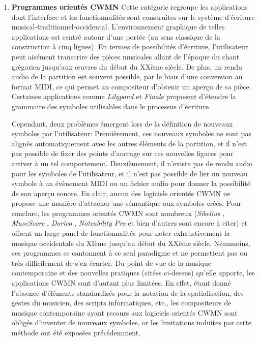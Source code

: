\begin{enumerate}[label=(\arabic*)]
	\item \textbf{Programmes orientés CWMN} Cette catégorie regroupe les applications dont l'interface et les fonctionnalités sont construites sur le système d'écriture musical-traditionnel-occidental. L'environnement graphique de telles applications est centré autour d'une portée (au sens classique de la construction à cinq lignes). En termes de possibilités d'écriture, l'utilisateur peut aisément transcrire des pièces musicales allant de l'époque du chant grégorien jusqu'aux œuvres du début du XXème siècle. De plus, un rendu audio de la partition est souvent possible, par le biais d'une conversion au format MIDI, ce qui permet au compositeur d'obtenir un aperçu de sa pièce. Certaines applications comme \textit{Lilypond} \cite{lilypond2018} et \textit{Finale} \cite{finale2018} proposent d'étendre la grammaire des symboles utilisables dans le processus d'écriture. 
	
	Cependant, deux problèmes émergent lors de la définition de nouveaux symboles par l'utilisateur: Premièrement, ces nouveaux symboles ne sont pas alignés automatiquement avec les autres éléments de la partition, et il n'est pas possible de fixer des points d'ancrage sur ces nouvelles figures pour arriver à un tel comportement. Deuxièmement, il n'existe pas de rendu audio pour les symboles de l'utilisateur, et il n'est pas possible de lier un nouveau symbole à un évènement MIDI ou un fichier audio pour donner la possibilité de son aperçu sonore. En clair, aucun des logiciels orientés CWMN ne propose une manière d'attacher une sémantique aux symboles créés.
Pour conclure, les programmes orientés CWMN sont nombreux (\textit{Sibelius} \cite{sibelius2018}, \textit{MuseScore} \cite{musescore2018}, \textit{Dorico} \cite{dorico2018}, \textit{Noteability Pro} \cite{noteAbility2018} et bien d'autres sont encore à citer) et offrent un large panel de fonctionnalités pour noter exhaustivement la musique occidentale du XIème jusqu'au début du XXème siècle.
Néanmoins, ces programmes se cantonnent à ce seul paradigme et ne permettent pas ou très difficilement de s'en écarter. Du point de vue de la musique contemporaine et des nouvelles pratiques (citées ci-dessus) qu'elle apporte, les applications CWMN sont d'autant plus limitées. En effet, étant donné l'absence d'éléments standardisés pour la notation de la spatialisation, des gestes du musicien, des scripts informatiques, etc., les compositeurs de musique contemporaine ayant recours aux logiciels orientés CWMN sont obligés d'inventer de nouveaux symboles, or les limitations induites par cette méthode ont été exposées précédemment.
  

\end{enumerate}
